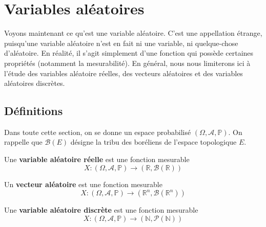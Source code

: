 \documentclass[../integ-proba.tex]{subfiles}
\begin{document}
    \chapter{Variables aléatoires}

    Voyons maintenant ce qu'est une variable aléatoire.
    C'est une appellation étrange, puisqu'une variable aléatoire n'est en fait ni une variable, ni quelque-chose d'aléatoire.
    En réalité, il s'agit simplement d'une fonction qui possède certaines propriétés (notamment la mesurabilité).
    En général, nous nous limiterons ici à l'étude des variables aléatoire réelles, des vecteurs aléatoires et des variables aléatoires discrètes.

    \section{Définitions}

    Dans toute cette section, on se donne un espace probabilisé $\left(\Omega, \mathcal{A}, \mathbb{P}\right)$.
    On rappelle que $\mathcal{B}(E)$ désigne la tribu des boréliens de l'espace topologique $E$.

    \begin{defi}
        Une \textbf{variable aléatoire réelle} est une fonction mesurable
        \begin{displaymath}
            X:\left(\Omega, \mathcal{A}, \mathbb{P}\right) \longrightarrow \left(\mathbb{R}, \mathcal{B}(\mathbb{R})\right)
        \end{displaymath}
    \end{defi}

    \begin{defi}
        Un \textbf{vecteur aléatoire} est une fonction mesurable
        \begin{displaymath}
          X:\left(\Omega, \mathcal{A}, \mathbb{P}\right) \longrightarrow \left(\mathbb{R}^n, \mathcal{B}(\mathbb{R}^n)\right)
        \end{displaymath}
    \end{defi}

    \begin{defi}
        \label{defi:variables_aleatoires_discretes}
        Une \textbf{variable aléatoire discrète} est une fonction mesurable
        \begin{displaymath}
          X:\left(\Omega, \mathcal{A}, \mathbb{P}\right) \longrightarrow \left(\mathbb{N}, \mathcal{P}(\mathbb{N})\right)
        \end{displaymath}
    \end{defi}
\end{document}

